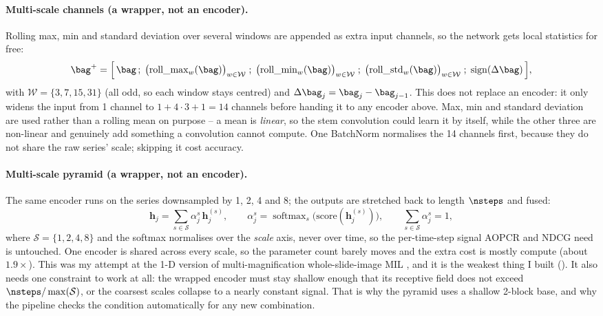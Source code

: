 \paragraph{Multi-scale channels (a wrapper, not an encoder).}
Rolling max, min and standard deviation over several windows are appended as extra input channels,
so the network gets local statistics for free:
\begin{equation}
  \bag^{+} = \Big[\, \bag \,;\; \big(\text{roll\_max}_w(\bag)\big)_{w \in \mathcal{W}} \;;\;
  \big(\text{roll\_min}_w(\bag)\big)_{w \in \mathcal{W}} \;;\;
  \big(\text{roll\_std}_w(\bag)\big)_{w \in \mathcal{W}} \;;\; \operatorname{sign}(\Delta \bag) \,\Big] ,
  \label{eq:mschan}
\end{equation}
with $\mathcal{W} = \{3,7,15,31\}$ (all odd, so each window stays centred) and
$\Delta \bag_j = \bag_j - \bag_{j-1}$. This does not replace an encoder: it only widens the input
from 1 channel to $1 + 4 \cdot 3 + 1 = 14$ channels before handing it to any encoder above. Max, min
and standard deviation are used rather than a rolling mean on purpose -- a mean is \emph{linear}, so
the stem convolution could learn it by itself, while the other three are non-linear and genuinely
add something a convolution cannot compute. One BatchNorm normalises the 14 channels first, because
they do not share the raw series' scale; skipping it cost accuracy.

\paragraph{Multi-scale pyramid (a wrapper, not an encoder).}
The same encoder runs on the series downsampled by 1, 2, 4 and 8; the outputs are stretched back to
length $\nsteps$ and fused:
\begin{equation}
  \mathbf{h}_j = \sum_{s \in \mathcal{S}} \alpha_j^{s} \, \mathbf{h}_j^{(s)} ,
  \qquad
  \alpha_j^{s} = \operatorname{softmax}_{s}\big(\text{score}(\mathbf{h}_j^{(s)})\big),
  \qquad \sum_{s \in \mathcal{S}} \alpha_j^{s} = 1 ,
  \label{eq:pyramid_fusion}
\end{equation}
where $\mathcal{S} = \{1,2,4,8\}$ and the softmax normalises over the \emph{scale} axis, never over
time, so the per-time-step signal AOPCR and NDCG need is untouched. One encoder is shared across
every scale, so the parameter count barely moves and the extra cost is mostly compute (about
$1.9\times$). This was my attempt at the 1-D version of multi-magnification whole-slide-image MIL
\citep{hashimoto2020msdamil}, and it is the weakest thing I built (). It
also needs one constraint to work at all: the wrapped encoder must stay shallow enough that its
receptive field does not exceed $\nsteps / \max(\mathcal{S})$, or the coarsest scales collapse to a
nearly constant signal. That is why the pyramid uses a shallow 2-block base, and why the pipeline
checks the condition automatically for any new combination.

